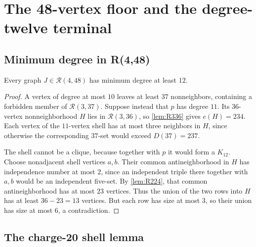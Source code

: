 \section{The 48-vertex floor and the degree-twelve terminal}
\label{sec:h12}

\subsection{Minimum degree in R(4,48)}

\begin{lemma}
\label{lem:R448-degree}
Every graph $J\in\mathcal R(4,48)$ has minimum degree at least $12$.
\end{lemma}

\begin{proof}
A vertex of degree at most $10$ leaves at least $37$ nonneighbors, containing a forbidden member of $\mathcal R(3,37)$. Suppose instead that $p$ has degree $11$. Its $36$-vertex nonneighborhood $H$ lies in $\mathcal R(3,36)$, so \cref{lem:R336} gives $e(H)=234$. Each vertex of the $11$-vertex shell has at most three neighbors in $H$, since otherwise the corresponding $37$-set would exceed $D(37)=237$.

The shell cannot be a clique, because together with $p$ it would form a $K_{12}$. Choose nonadjacent shell vertices $a,b$. Their common antineighborhood in $H$ has independence number at most $2$, since an independent triple there together with $a,b$ would be an independent five-set. By \cref{lem:R224}, that common antineighborhood has at most $23$ vertices. Thus the union of the two rows into $H$ has at least $36-23=13$ vertices. But each row has size at most $3$, so their union has size at most $6$, a contradiction.
\end{proof}

\subsection{The charge-20 shell lemma}

